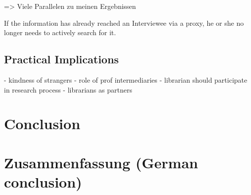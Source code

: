 \documentclass[12pt, a4paper, titlepage, oneside, abstract=true, toc=listof, toc=bibliography]{scrreprt}
\begin{document}
{\cite{Bulger2011} => Viele Parallelen zu meinen Ergebnissen


If the information has already reached an Interviewee via a proxy, he or she no longer needs to actively search for it.


\section{Practical Implications}


\cite{Constant1996} - kindness of strangers
\cite{Edmond2005} - role of prof intermediaries
\cite{Gunning1978} - librarian should participate in research process
\cite{MonroeGulick2013} - librarians as partners

\chapter{Conclusion}
\label{sec:conclusion}


\chapter{Zusammenfassung (German conclusion)}

 
\cleardoublepage			

}
\end{document}
